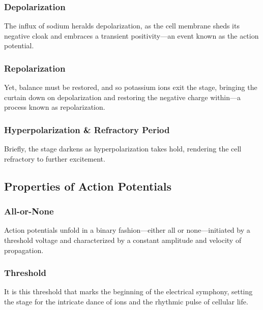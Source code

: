 \documentclass{article}
\begin{document}
\subsubsection{Depolarization}
The influx of sodium heralds depolarization, as the cell membrane sheds its negative cloak and embraces a transient positivity—an event known as the action potential.

\subsubsection{Repolarization}
Yet, balance must be restored, and so potassium ions exit the stage, bringing the curtain down on depolarization and restoring the negative charge within—a process known as repolarization.

\subsubsection{Hyperpolarization \& Refractory Period}
Briefly, the stage darkens as hyperpolarization takes hold, rendering the cell refractory to further excitement.

\subsection{Properties of Action Potentials}

\subsubsection{All-or-None}
Action potentials unfold in a binary fashion—either all or none—initiated by a threshold voltage and characterized by a constant amplitude and velocity of propagation.

\subsubsection{Threshold}
It is this threshold that marks the beginning of the electrical symphony, setting the stage for the intricate dance of ions and the rhythmic pulse of cellular life.
\end{document}

